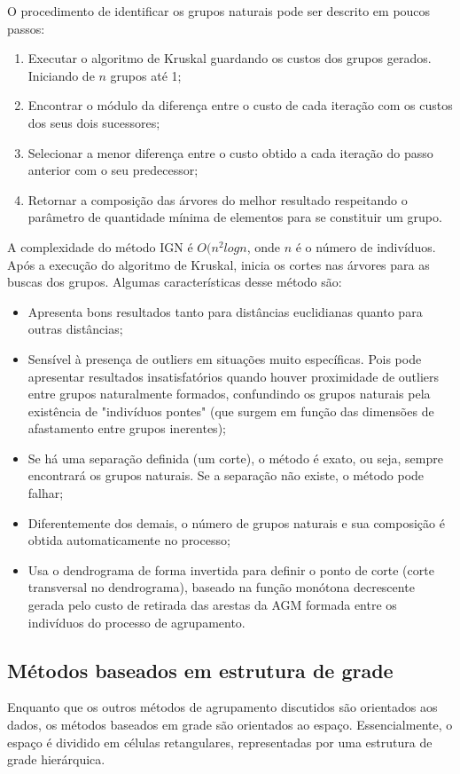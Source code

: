 O procedimento de identificar os grupos naturais pode ser descrito em poucos passos:
 \begin{enumerate}
\item Executar o algoritmo de Kruskal guardando os custos dos grupos gerados. Iniciando de ${n}$ grupos até 1;
\item Encontrar o módulo da diferença entre o custo de cada iteração com os custos dos seus dois sucessores;
\item Selecionar a menor diferença entre o custo obtido a cada iteração do passo anterior com o seu predecessor;
\item Retornar a composição das árvores do melhor resultado respeitando o parâmetro de quantidade mínima de elementos para se constituir um grupo.
\end{enumerate}

A complexidade do método IGN é ${O(n^2 log n}$, onde ${n}$ é o número de indivíduos. Após a execução do algoritmo de Kruskal, inicia os cortes nas árvores para as buscas dos grupos.
Algumas características desse método são:
\begin{itemize}
\item Apresenta bons resultados tanto para distâncias euclidianas quanto para outras distâncias;
\item Sensível à presença de outliers em situações muito específicas. Pois pode apresentar resultados insatisfatórios quando houver proximidade de outliers entre grupos naturalmente formados, confundindo os grupos naturais pela existência de "indivíduos pontes" (que surgem em função das dimensões de afastamento entre grupos inerentes);
\item Se há uma separação definida (um corte), o método é exato, ou seja, sempre encontrará os grupos naturais. Se a separação não existe, o método pode falhar;
\item Diferentemente dos demais, o número de grupos naturais e sua composição é obtida automaticamente no processo;
\item Usa o dendrograma de forma invertida para definir o ponto de corte (corte transversal no dendrograma), baseado na função monótona decrescente gerada pelo custo de retirada das arestas da AGM formada entre os indivíduos do processo de agrupamento.
\end{itemize}

\subsection{Métodos baseados em estrutura de grade}
Enquanto que os outros métodos de agrupamento discutidos são orientados aos dados, os métodos baseados em grade são orientados ao espaço. Essencialmente, o espaço é dividido em células retangulares, representadas por uma estrutura de grade hierárquica.

